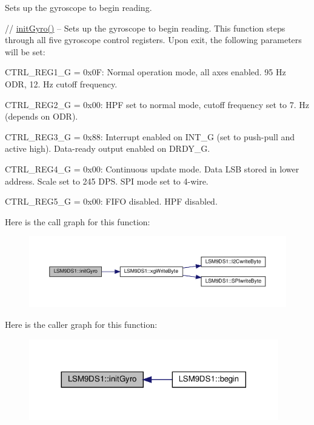 Sets up the gyroscope to begin reading. 

// \hyperlink{classLSM9DS1_a66a7b02acb28964ffc9362f25988e270}{init\+Gyro()} -- Sets up the gyroscope to begin reading. This function steps through all five gyroscope control registers. Upon exit, the following parameters will be set\+:
\begin{DoxyItemize}
\item C\+T\+R\+L\+\_\+\+R\+E\+G1\+\_\+G = 0x0F\+: Normal operation mode, all axes enabled. 95 Hz O\+DR, 12. Hz cutoff frequency.
\item C\+T\+R\+L\+\_\+\+R\+E\+G2\+\_\+G = 0x00\+: H\+PF set to normal mode, cutoff frequency set to 7. Hz (depends on O\+DR).
\item C\+T\+R\+L\+\_\+\+R\+E\+G3\+\_\+G = 0x88\+: Interrupt enabled on I\+N\+T\+\_\+G (set to push-\/pull and active high). Data-\/ready output enabled on D\+R\+D\+Y\+\_\+G.
\item C\+T\+R\+L\+\_\+\+R\+E\+G4\+\_\+G = 0x00\+: Continuous update mode. Data L\+SB stored in lower address. Scale set to 245 D\+PS. S\+PI mode set to 4-\/wire.
\item C\+T\+R\+L\+\_\+\+R\+E\+G5\+\_\+G = 0x00\+: F\+I\+FO disabled. H\+PF disabled. 
\end{DoxyItemize}Here is the call graph for this function\+:
\nopagebreak
\begin{figure}[H]
\begin{center}
\leavevmode
\includegraphics[width=350pt]{classLSM9DS1_a66a7b02acb28964ffc9362f25988e270_cgraph}
\end{center}
\end{figure}
Here is the caller graph for this function\+:
\nopagebreak
\begin{figure}[H]
\begin{center}
\leavevmode
\includegraphics[width=308pt]{classLSM9DS1_a66a7b02acb28964ffc9362f25988e270_icgraph}
\end{center}
\end{figure}
\mbox{\label{classLSM9DS1_ae60332c2836bd3f19846b7a44c015ddd}} 
